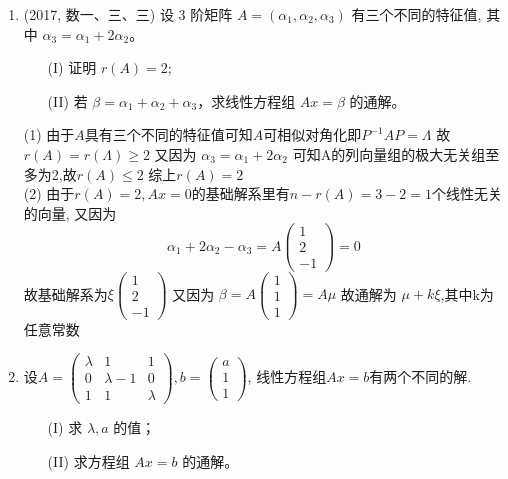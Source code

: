 \documentclass[12pt, a4paper, oneside, UTF8]{ctexbook}
\begin{document}
\begin{enumerate}
    \item (2017, 数一、三、三) 设 3 阶矩阵 $A = (\alpha_1, \alpha_2, \alpha_3)$ 有三个不同的特征值, 其中 $\alpha_3 = \alpha_1 + 2\alpha_2$。
    \begin{enumerate}
        \item [(I)] 证明 $r(A) = 2$;
        \item [(II)] 若 $\beta = \alpha_1 + \alpha_2 + \alpha_3$，求线性方程组 $Ax = \beta$ 的通解。
    \end{enumerate}
    
    \begin{solution}
    (1) 由于$A$具有三个不同的特征值可知$A$可相似对角化即$P^{-1}AP=\Lambda$ 故$r(A)=r(\Lambda)\geq 2$ 又因为
    $\alpha_3=\alpha_1+2\alpha_2$ 可知A的列向量组的极大无关组至多为2,故$r(A)\leq 2$ 综上$r(A)=2$  \\
    (2) 由于$r(A)=2,Ax=0$的基础解系里有$n-r(A)=3-2=1$个线性无关的向量, 又因为
    $$
    \alpha_1 + 2\alpha_2 - \alpha_3 = A\begin{pmatrix}
        1 \\
        2 \\
        -1 
    \end{pmatrix} = 0
    $$
    故基础解系为$\xi\begin{pmatrix}
        1 \\
        2 \\
        -1
    \end{pmatrix}$ 又因为 $\beta = A\begin{pmatrix}
        1 \\
        1 \\
        1 
    \end{pmatrix} = A\mu$ 故通解为 $\mu+k\xi$,其中k为任意常数
    \end{solution}
    
    \item 设$A=\begin{pmatrix}
        \lambda & 1 & 1 \\
        0 & \lambda - 1 & 0 \\
        1 & 1 & \lambda 
    \end{pmatrix}, b = \begin{pmatrix}
        a \\
        1 \\
        1
    \end{pmatrix}$, 线性方程组$Ax=b$有两个不同的解.

    \begin{enumerate}
        \item [(I)] 求 $\lambda, a$ 的值；
        \item [(II)] 求方程组 $Ax = b$ 的通解。
    \end{enumerate}
    

\end{enumerate}
\end{document}
